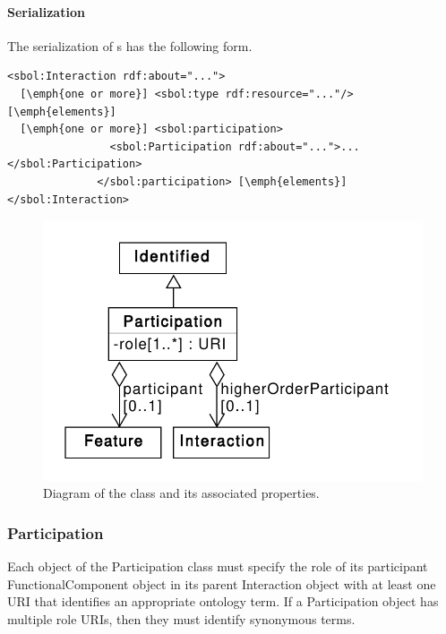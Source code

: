 \paragraph{Serialization}

The serialization of s has the following form.
\begin{lstlisting}
<sbol:Interaction rdf:about="...">
  [\emph{one or more}] <sbol:type rdf:resource="..."/> [\emph{elements}]
  [\emph{one or more}] <sbol:participation>
                <sbol:Participation rdf:about="...">...</sbol:Participation>
              </sbol:participation> [\emph{elements}]
</sbol:Interaction>
\end{lstlisting}

\begin{figure}[ht]
\begin{center}
\includegraphics[scale=0.6]{uml/participation}
\caption[]{Diagram of the  class and its associated properties.}
\label{uml:participation}
\end{center}
\end{figure}

\subsubsection{Participation}
\label{sec:Participation}


Each object of the Participation class must specify the role of its participant FunctionalComponent object in its parent Interaction object with at least one URI that identifies an appropriate ontology term. If a Participation object has multiple role URIs, then they must identify synonymous terms. 

